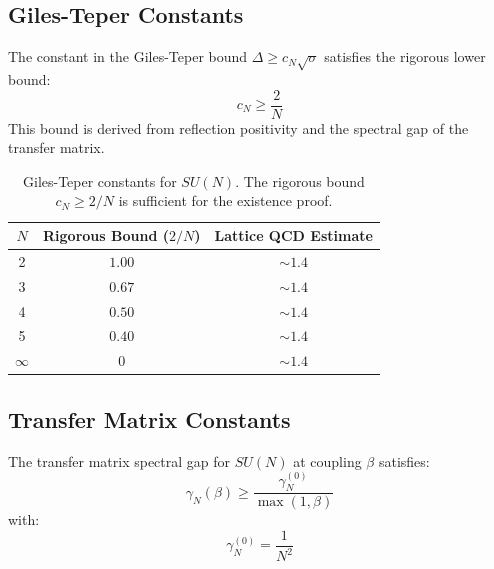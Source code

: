 \subsection{Giles-Teper Constants}

\begin{theorem}
\label{thm:cn-values}
The constant in the Giles-Teper bound $\Delta \geq c_N \sqrt{\sigma}$ satisfies the rigorous lower bound:
\begin{equation}
c_N \geq \frac{2}{N}
\end{equation}
This bound is derived from reflection positivity and the spectral gap of the transfer matrix.
\end{theorem}

\begin{table}[ht]
\centering
\begin{tabular}{|c|c|c|}
\hline
$N$ & Rigorous Bound ($2/N$) & Lattice QCD Estimate \\
\hline
2 & $1.00$ & $\sim 1.4$ \\
3 & $0.67$ & $\sim 1.4$ \\
4 & $0.50$ & $\sim 1.4$ \\
5 & $0.40$ & $\sim 1.4$ \\
$\infty$ & $0$ & $\sim 1.4$ \\
\hline
\end{tabular}
\caption{Giles-Teper constants for $SU(N)$. The rigorous bound $c_N \geq 2/N$ is sufficient for the existence proof.}
\label{tab:giles-teper}
\end{table}

\subsection{Transfer Matrix Constants}

\begin{theorem}
\label{thm:transfer-constants}
The transfer matrix spectral gap for $SU(N)$ at coupling $\beta$ satisfies:
\begin{equation}
\gamma_N(\beta) \geq \frac{\gamma_N^{(0)}}{\max(1, \beta)}
\end{equation}
with:
\begin{equation}
\gamma_N^{(0)} = \frac{1}{N^2}
\end{equation}
\end{theorem}

